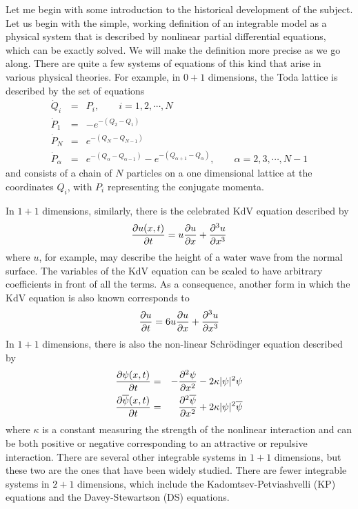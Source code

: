 \documentclass[a4paper,11pt]{article}
\begin{document}
Let me begin with some introduction to the historical development of
the subject. Let us begin with the simple, working  definition of an
integrable model as a physical system that is described by nonlinear partial
differential equations, which can be exactly solved. We will make the
definition more precise as we go along. There are quite a few systems
of equations of this kind that arise in various physical theories. For
example, in $0+1$ dimensions, the Toda lattice is described by the set
of equations
\begin{eqnarray}
\dot{Q}_{i} & = & P_{i},\qquad i = 1,2,\cdots , N\nonumber\\
\dot{P}_{1} & = & - e^{-(Q_{2}-Q_{1})}\nonumber\\
\dot{P}_{N} & = & e^{-(Q_{N}-Q_{N-1})}\nonumber\\
\dot{P}_{\alpha} & = & e^{-(Q_{\alpha} - Q_{\alpha -1})} -
e^{-(Q_{\alpha +1} - Q_{\alpha})},\qquad \alpha = 2,3,\cdots , N-1
\end{eqnarray}
and consists of a chain of $N$ particles on a one dimensional lattice
at the coordinates $Q_{i}$, with $P_{i}$ representing the conjugate
momenta. 

In $1+1$ dimensions, similarly, there is the celebrated KdV equation
described by
\begin{equation}
{\partial u(x,t)\over \partial t} = u {\partial u\over \partial x} +
{\partial^{3} u\over \partial x^{3}}
\end{equation}
where $u$, for example, may describe the height of a water wave from
the normal surface. The variables of the KdV equation can be scaled to
have arbitrary coefficients in front of all the terms. As a
consequence, 
another form in which the KdV equation is also known corresponds to
\begin{equation}
{\partial u\over \partial t} = 6 u {\partial u\over \partial x} +
{\partial^{3} u\over \partial x^{3}}
\end{equation}
In $1+1$
dimensions, there is also the non-linear Schr\"{o}dinger equation
described by
\begin{eqnarray}
{\partial\psi(x,t)\over \partial t} & = & -
{\partial^{2}\psi\over \partial x^{2}} - 2\kappa |\psi|^{2}
\psi\nonumber\\
{\partial\overline{\psi}(x,t)\over \partial t} & = &
{\partial^{2}\overline{\psi}\over \partial x^{2}} + 2\kappa |\psi|^{2}
\overline{\psi} 
\end{eqnarray}
where $\kappa$ is a constant measuring the strength of the nonlinear
interaction and can be both positive or negative corresponding to an
attractive or repulsive interaction. There are several other
integrable systems in $1+1$ dimensions, but these two are the ones
that have been widely studied. There are fewer integrable systems in
$2+1$ dimensions, which include the Kadomtsev-Petviashvelli (KP)
equations and the Davey-Stewartson (DS) equations.
\end{document}
